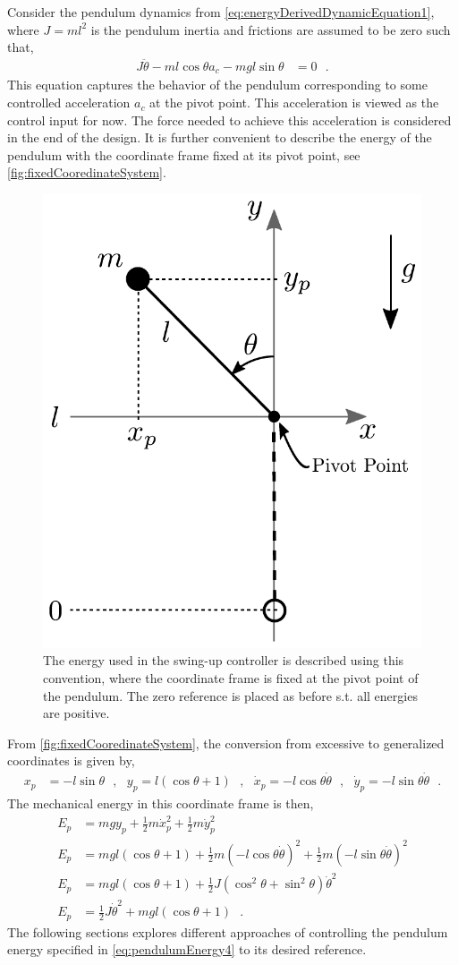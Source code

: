 Consider the pendulum dynamics from \autoref{eq:energyDerivedDynamicEquation1}, where $J = m l^2$ is the pendulum inertia and frictions are assumed to be zero such that,
\begin{align}
  J \ddot{\theta} - m l \cos \theta a_c - m g l \sin \theta  &= 0 \ \ \ .  \label{eq:pendulumDynamics}
\end{align}
This equation captures the behavior of the pendulum corresponding to some controlled acceleration $a_c$ at the pivot point. This acceleration is viewed as the control input for now. The force needed to achieve this acceleration is considered in the end of the design. It is further convenient to describe the energy of the pendulum with the coordinate frame fixed at its pivot point, see \autoref{fig:fixedCooredinateSystem}.
%
\begin{figure}[H]
  \includegraphics[width=.3\textwidth]{figures/fixedCooredinateSystem}
  \caption{The energy used in the swing-up controller is described using this convention, where the coordinate frame is fixed at the pivot point of the pendulum. The zero reference is placed as before s.t. all energies are positive.}
  \label{fig:fixedCooredinateSystem}
\end{figure}
%
From \autoref{fig:fixedCooredinateSystem}, the conversion from excessive to generalized coordinates is given by,
\begin{align}
  x_p  &= -l \sin \theta   \ \ \ ,\ \ \ y_p = l(\cos \theta + 1)  \ \ \ ,\ \ \ \dot{x}_p = -l \cos \theta \dot{\theta}  \ \ \ ,\ \ \ \dot{y}_p = -l \sin \theta \dot{\theta}  \ \ \ .  \label{eq:cooredinateConvertFixed}
\end{align}
The mechanical energy in this coordinate frame is then,
\begin{align}
  E_p &= m g y_p + \tfrac{1}{2} m \dot{x}_p^2 + \tfrac{1}{2} m \dot{y}_p^2   \label{eq:pendulumEnergy1} \\
  E_p &= m g l (\cos \theta +1) + \tfrac{1}{2} m (-l \cos \theta \dot{\theta})^2 + \tfrac{1}{2} m (-l \sin \theta \dot{\theta})^2  \label{eq:pendulumEnergy2} \\
  E_p &= m g l (\cos \theta +1) + \tfrac{1}{2} J (\cos^2 \theta  + \sin^2 \theta )\dot{\theta}^2   \label{eq:pendulumEnergy3} \\
  E_p &= \tfrac{1}{2} J \dot{\theta}^2 + m g l (\cos \theta +1) \ \ \ .   \label{eq:pendulumEnergy4}
\end{align}
The following sections explores different approaches of controlling the pendulum energy specified in \autoref{eq:pendulumEnergy4} to its desired reference.


